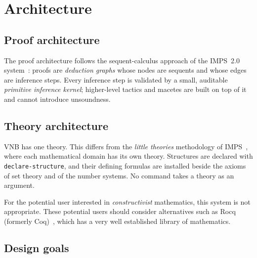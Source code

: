 \section{Architecture}
\label{sec:architecture}

\subsection{Proof architecture}

\begin{sloppypar}
The proof architecture follows the sequent-calculus approach of the
IMPS~2.0 system~\cite{IMPS}: proofs are \emph{deduction graphs} whose
nodes are sequents and whose edges are inference steps.  Every inference
step is validated by a small, auditable \emph{primitive inference kernel};
higher-level tactics and macetes are built on top of it and cannot
introduce unsoundness.
\end{sloppypar}

\subsection{Theory architecture}

VNB has one theory.  This differs from the \emph{little theories}
methodology of IMPS~\cite{IMPS}, where each mathematical domain has its
own theory.  Structures are declared with \texttt{declare-structure},
and their defining formulas are installed beside the axioms of set theory
and of the number systems.  No command takes a theory as an argument.

\begin{remark}\label{remark:27137-61828-986360}
%
For the potential user interested in \emph{constructivist} mathematics,
this system is not appropriate. These potential users should consider
alternatives such as Rocq (formerly Coq)~\cite{Rocq}, which has a very well established library of
mathematics.
%
\end{remark}

\subsection{Design goals}

